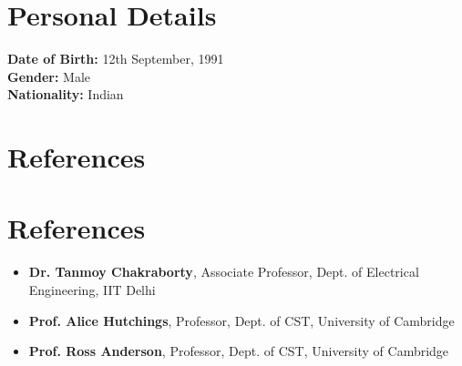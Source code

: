 \documentclass[margin, centered,lmodern]{res}
\begin{document}
\begin{resume}

\section{Personal Details}
\textbf{Date of Birth:} 12th September, 1991 \\
\textbf{Gender:} Male \\ 
\textbf{Nationality:} Indian

\section{References}
\section{References}
\begin{itemize}[leftmargin=*]
\item[] \textbf{Dr. Tanmoy Chakraborty}, Associate Professor, Dept. of Electrical Engineering,  IIT Delhi
\item[] \textbf{Prof. Alice Hutchings}, Professor, Dept. of CST, University of Cambridge
\item[] \textbf{Prof. Ross Anderson}, Professor, Dept. of CST, University of Cambridge

\end{itemize}


\end{resume}
\end{document}
